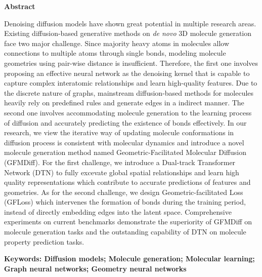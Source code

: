 \clearpage
{}
\begin{center}
    \textbf{ Abstract}
\end{center}
Denoising diffusion models have shown great potential in multiple research areas. Existing diffusion-based generative methods on {\itshape de novo} 3D molecule generation face two major challenge. Since majority heavy atoms in molecules allow connections to multiple atoms through single bonds, modeling molecule geometries using pair-wise distance is insufficient. Therefore, the first one involves proposing an effective neural network as the denoising kernel that is capable to capture complex interatomic relationships and learn high-quality features. Due to the discrete nature of graphs, mainstream diffusion-based methods for molecules heavily rely on predefined rules and generate edges in a indirect manner. The second one involves accommodating molecule generation to the learning process of diffusion and accurately predicting the existence of bonds effectively. In our research, we view the iterative way of updating molecule conformations in diffusion process is consistent with molecular dynamics and introduce a novel molecule generation method named Geometric-Facilitated Molecular Diffusion (GFMDiff). For the first challenge, we introduce a Dual-track Transformer Network (DTN) to fully excevate global spatial relationships and learn high quality representations which contribute to accurate predictions of features and geometries. As for the second challenge, we design Geometric-facilitated Loss (GFLoss) which intervenes the formation of bonds during the training period, instead of directly embedding edges into the latent space. Comprehensive experiments on current benchmarks demonstrate the superiority of GFMDiff on molecule generation tasks and the outstanding capability of DTN on molecule property prediction tasks.

\vspace{20pt}
\noindent \textbf{Keywords: Diffusion models; Molecule generation; Molecular learning; Graph neural networks; Geometry neural networks}
\clearpage

\tableofcontents

\begingroup
    \renewcommand*{\addvspace}[1]{}
    \cleardoublepage
    \marklof
    \listoffigures

    \cleardoublepage
    \marklot
    \listoftables
\endgroup

